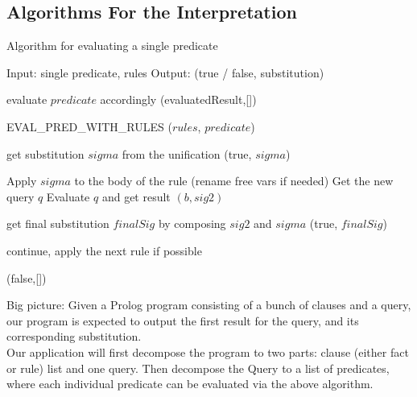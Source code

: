 \documentclass[11pt,a4paper]{report}
\begin{document}
\subsection*{Algorithms For the Interpretation}

\begin{algorithm}
	\caption{Algorithm for evaluating a single predicate}
	
	\begin{algorithmic}
		\State Input: single predicate, rules
		\State Output: (true / false, substitution)
		
				\State evaluate $predicate$ accordingly
				\State \Return (evaluatedResult,[])
			
			\Else
				\State \Return EVAL\_PRED\_WITH\_RULES ($rules$, $predicate$)
			\EndIf
			
		\EndFunction
		
					\State get substitution $sigma$ from the unification
						\State \Return (true, $sigma$)	
						
					\Else
						\State Apply $sigma$ to the body of the rule (rename free vars if needed)
						\State Get the new query $q$
						\State Evaluate $q$ and get result $(b,sig2)$
						
							\State get final substitution $finalSig$ by composing $sig2$ and $sigma$
							\State \Return (true, $finalSig$)
							
						\Else
							\State continue, apply the next rule if possible
						\EndIf				
					\EndIf
				\EndIf
			\EndFor
			
			\State \Return (false,[])
		
		\EndFunction
		
	\end{algorithmic}
	
\end{algorithm}


\bigskip
Big picture:
Given a Prolog program consisting of a bunch of clauses and a query, our program is expected to
output the first result for the query, and its corresponding substitution. \\

Our application will first decompose the program to two parts: clause (either fact or rule) list and one query. Then decompose the Query to a list of predicates, where each individual predicate can be evaluated via the above algorithm. \\
\end{document}
